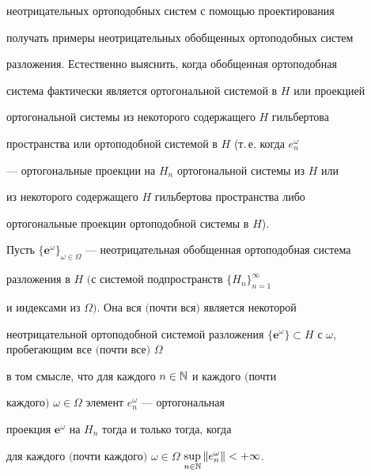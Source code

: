 неотрицательных ортоподобных систем с помощью проектирования


получать примеры неотрицательных обобщенных ортоподобных систем


разложения. Естественно выяснить, когда обобщенная ортоподобная


система фактически является ортогональной системой в $H$ или проекцией


ортогональной системы из некоторого содержащего $H$ гильбертова


пространства или ортоподобной системой в $H$ (т.\,е. когда $e^\omega_n$


--- ортогональные проекции на $H_n$ ортогональной системы из $H$ или


из некоторого содержащего $H$ гильбертова пространства либо


ортогональные проекции ортоподобной системы в $H$).





\begin{thm}\hspace{-1.8mm}{\bf.}


Пусть $\{\boldsymbol e^\omega\}_{\omega\in


\Omega}$ --- неотрицательная обобщенная ортоподобная система


разложения в $H$ $($с системой подпространств $\{H_n\}_{n=1}^\infty$


и индексами из $\Omega)$. Она вся $($почти вся$)$ является некоторой


неотрицательной ортоподобной системой разложения $\{\boldsymbol


e^\omega\}\subset H$ с $\omega$, пробегающим все $($почти все$)$ $\Omega$


в том смысле, что для каждого $n\in\Bbb N$ и каждого $($почти


каждого$)$ $\omega\in\Omega$ элемент $e^\omega_n$ --- ортогональная


проекция $\boldsymbol e^\omega$ на $H_n$ тогда и только тогда, когда


для каждого $($почти каждого$)$ $\omega\in\Omega$\; $\sup\limits_{n\in\Bbb N}


\|e^\omega_n\|<+\infty$.


\end{thm}





